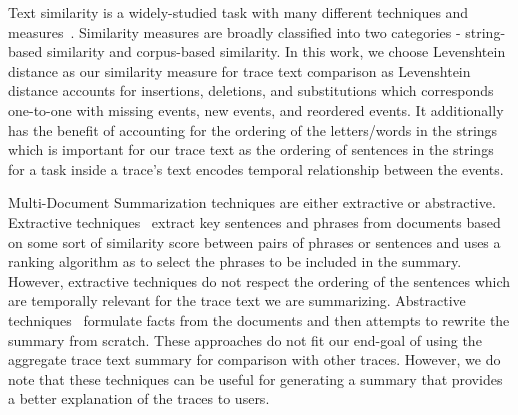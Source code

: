 Text similarity is a widely-studied task with many different techniques and measures~\cite{gomaa2013survey}.
Similarity measures are broadly classified into two categories - string-based similarity and corpus-based similarity.
In this work, we choose Levenshtein distance as our similarity measure for trace text comparison as Levenshtein distance
accounts for insertions, deletions, and substitutions which corresponds one-to-one with missing events, new events,
and reordered events. It additionally has the benefit of accounting for the ordering of the letters/words in the strings
which is important for our trace text as the ordering of sentences in the strings for a task inside a trace's text
encodes temporal relationship between the events.

Multi-Document Summarization techniques are either extractive or abstractive. Extractive techniques~\cite{xiao2019extractive,liu2019hierarchical,erkan2004lexrank} extract key sentences
and phrases from documents based on some sort of similarity score between pairs of phrases or sentences and
uses a ranking algorithm as to select the phrases to be included in the summary. However, extractive techniques do not respect
the ordering of the sentences which are temporally relevant for the trace text we are summarizing.
Abstractive techniques~\cite{devlin2018bert,bing2015abstractive} formulate facts from the documents and then attempts to rewrite the summary from scratch. These approaches
do not fit our end-goal of using the aggregate trace text summary for comparison with other traces. However, we do note
that these techniques can be useful for generating a summary that provides a better explanation of the traces to users.